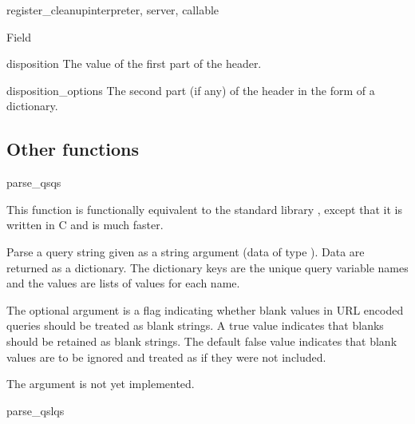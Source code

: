 \begin{funcdesc}{register_cleanup}{interpreter, server, callable}
\begin{classdesc}{Field}{}
  \begin{memberdesc}{disposition}
    The value of the first part of the  header.
  \end{memberdesc}

  \begin{memberdesc}{disposition_options}
    The second part (if any) of the  header in
    the form of a dictionary.
  \end{memberdesc}

  \begin{seealso}
  \end{seealso}
\end{classdesc}

\subsection{Other functions\label{pyapi-util-funcs}}

\begin{funcdesc}{parse_qs}{qs}

  This function is functionally equivalent to the standard library
   , except that it is written in C and is
  much faster. 

  Parse a query string given as a string argument (data of type
  ).  Data are
  returned as a dictionary.  The dictionary keys are the unique query
  variable names and the values are lists of values for each name.

  The optional argument  is a flag indicating
  whether blank values in URL encoded queries should be treated as blank
  strings.  A true value indicates that blanks should be retained as
  blank strings.  The default false value indicates that blank values
  are to be ignored and treated as if they were not included.

  \begin{notice}
    The  argument is not yet implemented.
  \end{notice}

\end{funcdesc}


\begin{funcdesc}{parse_qsl}{qs}


\end{funcdesc}
\end{funcdesc}

